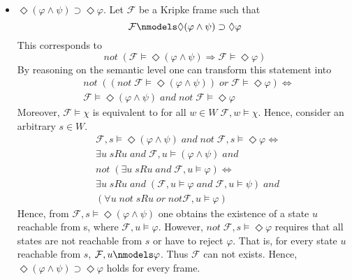 \documentclass[11pt,a4paper]{article}
\newcommand{\lto}{\supset}
\newcommand{\some}{\Diamond}
\newcommand{\sand}{\; and \;}
\newcommand{\sor}{ \; or \;}
\newcommand{\sneg}{not \;}
\newcommand{\sto}{\Rightarrow}
\begin{document}
\begin{itemize}
\item $\some (\varphi \land \psi) \lto \some  \varphi$. Let $\mathcal{F}$ be a Kripke frame such that 
\begin{equation*}
\mathcal{F} \nmodels \some (\varphi \land \psi) \lto \some  \varphi
\end{equation*}
This corresponds to  
\begin{equation*}
\sneg (\mathcal{F} \models \some (\varphi \land \psi) \sto  \mathcal{F} \models \some  \varphi)
\end{equation*}
By reasoning on the semantic level one can transform this statement into 
\begin{equation*}
\begin{split}
&\sneg ((\sneg \mathcal{F} \models \some (\varphi \land \psi)) \sor  \mathcal{F} \models \some  \varphi) \iff \\
&\mathcal{F} \models \some (\varphi \land \psi) \sand  \sneg \mathcal{F} \models \some  \varphi 
\end{split}
\end{equation*}
Moreover, $\mathcal{F} \models \chi$ is equivalent to for all $w \in W \; \mathcal{F},w \models \chi$. Hence, consider an arbitrary $s \in W$.
\begin{equation*}
\begin{split}
&\mathcal{F},s \models \some (\varphi \land \psi) \sand  \sneg \mathcal{F},s \models \some  \varphi \iff\\
& \exists u \; sRu \sand \mathcal{F},u \models (\varphi \land \psi) \sand  \\
&\sneg (\exists u \; sRu \sand \mathcal{F},u \models \varphi) \iff  \\
& \exists u \; sRu \sand (\mathcal{F},u \models \varphi \sand \mathcal{F},u \models \psi) \sand  \\
& (\forall u \; \sneg sRu \sor  not \mathcal{F},u \models \varphi)
\end{split}
\end{equation*}
Hence, from $\mathcal{F},s \models \some (\varphi \land \psi)$ one obtains the existence of a state $u$ reachable from s, where $\mathcal{F},u \models \varphi$. However, $\sneg \mathcal{F},s \models \some  \varphi$ requires that all states are not reachable from $s$ or have to reject $\varphi$. That is, for every state $u$ reachable from $s$, $\mathcal{F},u \nmodels \varphi$. Thus $\mathcal{F}$ can not exists. Hence, $\some (\varphi \land \psi) \lto \some  \varphi$ holds for every frame.



\end{itemize}
\end{document}
